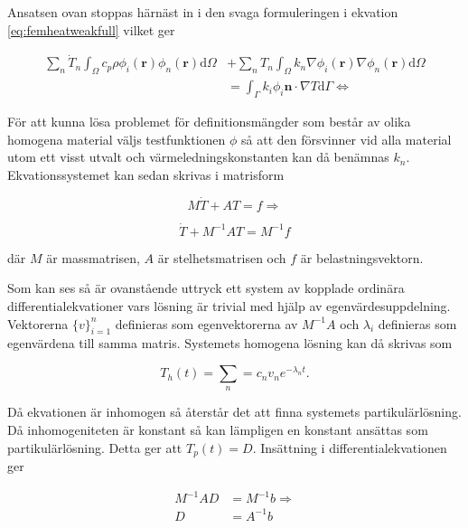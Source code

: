 Ansatsen ovan stoppas härnäst in i den svaga formuleringen i ekvation
\eqref{eq:femheatweakfull} vilket ger

\begin{align}
\label{eq:femheatgalerkin}
\sum_n \dot{T}_n \int_\Omega c_p\rho\phi_i(\mathbf{r})
\phi_n(\mathbf{r})\mathrm{d}\Omega
& + \sum_n T_n \int_\Omega k_n \nabla\phi_i(\mathbf{r})\nabla\phi_n(\mathbf{r})
\mathrm{d}\Omega \\
&= \int_\Gamma k_i\phi_i\mathbf{n}\cdot\nabla T\mathrm{d}\Gamma \Leftrightarrow
\nonumber
\end{align}

För att kunna lösa problemet för definitionsmängder som består av olika
homogena material väljs testfunktionen $\phi$ så att den försvinner vid
alla material utom ett visst utvalt och värmelednings\-konstanten kan då benämnas $k_n$.
Ekvationssystemet kan sedan skrivas i matrisform

\begin{equation}
\label{eq:femheatmatrix}
M\dot{T} + AT = f \Rightarrow
\end{equation}

\begin{equation}
\label{eq:femheatmatrix2}
\dot{T} + M^{-1}AT = M^{-1}f
\end{equation}

där $M$ är massmatrisen, $A$ är stelhetsmatrisen och $f$ är belastningsvektorn.

Som kan ses så är ovanstående uttryck ett system av kopplade ordinära
differential\-ekvationer vars lösning är trivial med hjälp av egenvärdes\-uppdelning.
Vektorerna $\{v\}^n_{i=1}$ definieras som egenvektorerna av
$M^{-1}A$ och $\lambda_i$ definieras som egenvärdena till samma matris.
Systemets homogena lösning kan då skrivas som\cite{lay06}

\begin{equation}
\label{eq:femheathom}
T_h(t) = \sum_n = c_nv_ne^{-\lambda_nt}.
\end{equation}

Då ekvationen är inhomogen så återstår det att finna systemets
partikulärlösning. Då inhomogeniteten är konstant så kan lämpligen
en konstant ansättas som partikulärlösning. Detta ger att
$T_{p}(t) = D$. Insättning i differentialekvationen ger

\begin{align}
\label{eq:femheatinstopp}
M^{-1}AD &= M^{-1}b \Rightarrow\\
\label{eq:femheatinstopp2}
D &= A^{-1}b
\end{align}

